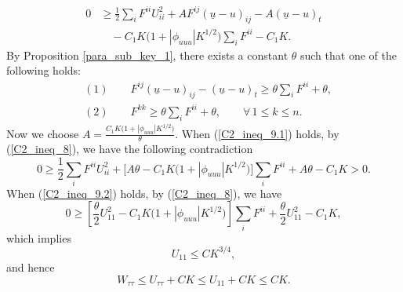 \documentclass[12pt]{amsart}
\theoremstyle{definition}
\theoremstyle{remark}
\numberwithin{equation}{section}
\begin{document}
\begin{equation}\label{C2_ineq_8}
\begin{aligned}
0 &\geq \frac{1}{2} \sum_i F^{ii} U_{ii}^2 + A F^{ij} (\underline{u} -u)_{ij} - A(\underline{u} - u)_t \\
&\quad -  C_1 K \Big(1 + |\phi_{uuu}| K^{1/2}\Big) \sum_i F^{ii} - C_1 K.
\end{aligned}
\end{equation}
By Proposition \ref{para_sub_key_1}, there exists a constant $\theta$ such that one of the following holds:
\begin{align}
&(1) \qquad F^{ij} (\underline{u} - u)_{ij} - (\underline{u} - u)_t \geq \theta \sum_i F^{ii} + \theta,
\label{C2_ineq_9.1}\\
&(2) \qquad F^{kk} \geq \theta \sum_i F^{ii} + \theta, \qquad \forall\, 1 \leq k \leq n. \label{C2_ineq_9.2}
\end{align}
Now we choose $A = \frac{C_1 K \big(1 + |\phi_{uuu}| K^{1/2}\big)}{\theta}$. When (\ref{C2_ineq_9.1}) holds, by (\ref{C2_ineq_8}), we have the following contradiction
\begin{equation}
0 \geq \frac{1}{2} \sum_i F^{ii} U_{ii}^2 + \big[A\theta -  C_1 K \big(1 + |\phi_{uuu}| K^{1/2}\big)\big] \sum_i F^{ii} + A\theta - C_1 K  > 0.
\end{equation}
When (\ref{C2_ineq_9.2}) holds, by (\ref{C2_ineq_8}), we have
\begin{equation}
0 \geq \left[\frac{\theta}{2} U_{11}^2 -  C_1 K \big(1 + |\phi_{uuu}| K^{1/2}\big) \right] \sum_i F^{ii} + \frac{\theta}{2} U_{11}^2 -  C_1 K,
\end{equation}
which implies
\begin{equation}
U_{11} \leq C K^{3/4},
\end{equation}
and hence
\begin{equation}\label{C2_ineq_10}
W_{\tau\tau} \leq U_{\tau\tau} + CK \leq U_{11} + CK \leq C K.
\end{equation}
\end{document}
